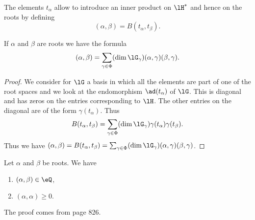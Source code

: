 The elements \( t_{\alpha}\) allow to introduce an inner product on \( \lH^*\) and hence on the roots by defining
\begin{equation}
    (\alpha,\beta)=B(t_{\alpha},t_{\beta}).
\end{equation}

\begin{lemma}       \label{Leminnerabequaaggb}
    If \( \alpha\) and \( \beta\) are roots we have the formula
    \begin{equation}
        (\alpha,\beta)=\sum_{\gamma\in\Phi}(\dim\lG_{\gamma})(\alpha,\gamma)(\beta,\gamma).
    \end{equation}
\end{lemma}

\begin{proof}
    We consider for \( \lG\) a basis in which all the elements are part of one of the root spaces and we look at the endomorphism \( \ad(t_{\alpha})\) of \( \lG\). This is diagonal and has zeros on the entries corresponding to \( \lH\). The other entries on the diagonal are of the form \( \gamma(t_{\alpha})\). Thus
    \begin{equation}
        B(t_{\alpha},t_{\beta})=\sum_{\gamma\in\Phi}(\dim\lG_{\gamma})\gamma(t_{\alpha})\gamma(t_{\beta}).
    \end{equation}
    Thus we have \( (\alpha,\beta)=B(t_{\alpha},t_{\beta})=\sum_{\gamma\in\Phi}(\dim\lG_{\gamma})(\alpha,\gamma)(\beta,\gamma)\).
\end{proof}

\begin{proposition}     \label{PropScalrooTsQ}
    Let \( \alpha\) and \( \beta\) be roots. We have
    \begin{enumerate}
        \item
            \( (\alpha,\beta)\in\eQ\),
        \item
            \( (\alpha,\alpha)\geq 0\).
    \end{enumerate}
\end{proposition}
The proof comes from \cite{Cornwell} page 826.

